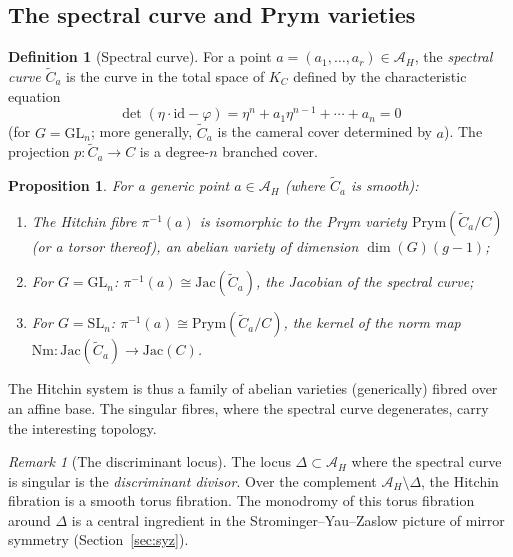 \documentclass[11pt]{article}
\newtheorem{proposition}[theorem]{Proposition}
\theoremstyle{definition}
\newtheorem{definition}[theorem]{Definition}
\theoremstyle{remark}
\newtheorem{remark}[theorem]{Remark}
\newcommand{\id}{\mathrm{id}}
\newcommand{\cA}{\mathcal{A}}
\newcommand{\Prym}{\mathrm{Prym}}
\newcommand{\Jac}{\mathrm{Jac}}
\begin{document}
\subsection{The spectral curve and Prym varieties}

\begin{definition}[Spectral curve]
\label{def:spectral-curve}
For a point $a = (a_1, \ldots, a_r) \in \cA_H$, the \emph{spectral curve} $\widetilde{C}_a$ is the curve in the total space of $K_C$ defined by the characteristic equation
\[
 \det(\eta \cdot \id - \varphi) = \eta^n + a_1 \eta^{n-1} + \cdots + a_n = 0
\]
(for $G = \mathrm{GL}_n$; more generally, $\widetilde{C}_a$ is the cameral cover determined by $a$). The projection $p \colon \widetilde{C}_a \to C$ is a degree-$n$ branched cover.
\end{definition}

\begin{proposition}
\label{prop:hitchin-fiber}
For a generic point $a \in \cA_H$ (where $\widetilde{C}_a$ is smooth):
\begin{enumerate}[label=(\roman*)]
 \item The Hitchin fibre $\pi^{-1}(a)$ is isomorphic to the Prym variety $\Prym(\widetilde{C}_a / C)$ (or a torsor thereof), an abelian variety of dimension $\dim(G)(g-1)$;
 \item For $G = \mathrm{GL}_n$: $\pi^{-1}(a) \cong \Jac(\widetilde{C}_a)$, the Jacobian of the spectral curve;
 \item For $G = \mathrm{SL}_n$: $\pi^{-1}(a) \cong \Prym(\widetilde{C}_a / C)$, the kernel of the norm map $\mathrm{Nm} \colon \Jac(\widetilde{C}_a) \to \Jac(C)$.
\end{enumerate}
\end{proposition}

The Hitchin system is thus a family of abelian varieties (generically) fibred over an affine base. The singular fibres, where the spectral curve degenerates, carry the interesting topology.

\begin{remark}[The discriminant locus]
\label{rem:discriminant}
The locus $\Delta \subset \cA_H$ where the spectral curve is singular is the \emph{discriminant divisor}. Over the complement $\cA_H \setminus \Delta$, the Hitchin fibration is a smooth torus fibration. The monodromy of this torus fibration around $\Delta$ is a central ingredient in the Strominger--Yau--Zaslow picture of mirror symmetry (Section~\ref{sec:syz}).
\end{remark}
\end{document}

